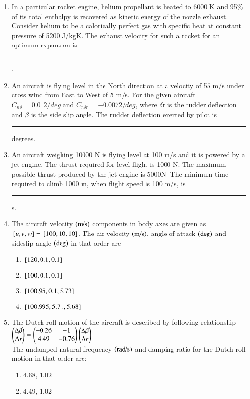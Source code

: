 \documentclass[journal]{IEEEtran}
\numberwithin{equation}{enumi}
\numberwithin{figure}{enumi}
\begin{document}
\begin{enumerate}
\item In a particular rocket engine, helium propellant is heated to 6000 K and 95\% of its total enthalpy is recovered as kinetic energy of the nozzle exhaust. Consider helium to be a calorically perfect gas with specific heat at constant pressure of 5200 J/kgK. The exhaust velocity for such a rocket for an optimum expansion is \rule{1cm}{0.4pt}.
\item An aircraft is flying level in the North direction at a velocity of 55 m/s under cross wind from East to West of 5 m/s. For the given aircraft $C_{n\beta} = 0.012/deg$ and $C_{n\delta r} = -0.0072/deg$, where $\delta$r is the rudder deflection and $\beta$ is the side slip angle. The rudder deflection exerted by pilot is \rule{1cm}{0.4pt} degrees.
\item An aircraft weighing 10000 N is flying level at 100 m/s and it is powered by a jet engine. The thrust required for level flight is 1000 N. The maximum possible thrust produced by the jet engine is 5000N. The minimum time required to climb 1000 m, when flight speed is 100 m/s, is \rule{1cm}{0.4pt} s.
\item The aircraft velocity $\left(\text{m/s}\right)$ components in body axes are given as ${}\left[u, v, w\right] = {}\left[100, 10, 10\right]$. The air velocity $\left(\text{m/s}\right)$, angle of attack $\left(\text{deg}\right)$ and sideslip angle $\left(\text{deg}\right)$ in that order are
\begin{enumerate}
\item ${}\left[120, 0.1, 0.1\right]$
\item ${}\left[100, 0.1, 0.1\right]$
\item ${}\left[100.95, 0.1, 5.73\right]$
\item ${}\left[100.995, 5.71, 5.68\right]$
\end{enumerate}
\item The Dutch roll motion of the aircraft is described by following relationship \\
$\begin{pmatrix}\Delta\beta \\
        \Delta r\end{pmatrix} = \begin{pmatrix}-0.26 & -1 \\
	                   4.49 & -0.76\end{pmatrix}\begin{pmatrix}\Delta\beta \\
			                       \Delta r\end{pmatrix}$ \\
The undamped natural frequency $\left(\text{rad/s}\right)$ and damping ratio for the Dutch roll motion in that order are:
\begin{enumerate}
\item 4.68, 1.02
\item 4.49, 1.02

\end{enumerate}
\end{enumerate}
\end{document}
